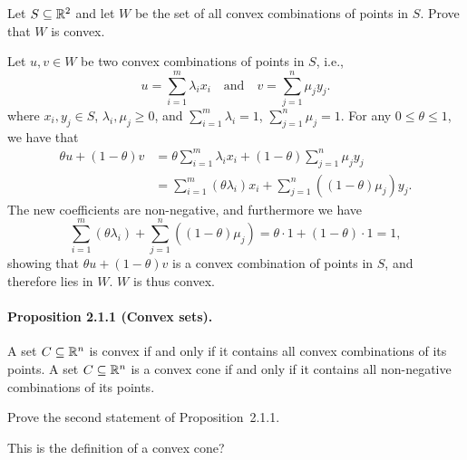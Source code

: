 \begin{exercise}
  Let $S \subseteq \mathbb{R}^2$ and let $W$ be the set of all convex combinations of points in $S$.
  Prove that $W$ is convex.
\end{exercise}

\begin{solution}
  Let $u, v \in W$ be two convex combinations of points in $S$, i.e.,
  \begin{equation}
    u = \sum_{i=1}^m \lambda_i x_i
    \quad\text{and}\quad
    v = \sum_{j=1}^n \mu_j y_j.
  \end{equation}
  where $x_i, y_j \in S$, $\lambda_i, \mu_j \geq 0$, and $\sum_{i=1}^m \lambda_i = 1$, $\sum_{j=1}^n \mu_j = 1$.
  For any $0 \leq \theta \leq 1$, we have that
  \begin{equation}
    \begin{split}
      \theta u + (1 - \theta) v
      &= \theta \sum_{i=1}^m \lambda_i x_i + (1 - \theta) \sum_{j=1}^n \mu_j y_j \\
      &= \sum_{i=1}^m (\theta \lambda_i) x_i + \sum_{j=1}^n ((1 - \theta) \mu_j) y_j.
    \end{split}
  \end{equation}
  The new coefficients are non-negative, and furthermore we have
  \begin{equation}
    \sum_{i=1}^m (\theta \lambda_i) + \sum_{j=1}^n ((1 - \theta) \mu_j)
    = \theta \cdot 1 + (1 - \theta) \cdot 1
    = 1,
  \end{equation}
  showing that $\theta u + (1 - \theta) v$ is a convex combination of points in $S$, and therefore lies in $W$.
  $W$ is thus convex.
\end{solution}

\paragraph{Proposition 2.1.1 (Convex sets).}
A set $C \subseteq \mathbb{R}^n$ is convex if and only if it contains all convex combinations of its points.
A set $C \subseteq \mathbb{R}^n$ is a convex cone if and only if it contains all non-negative combinations of its points.

\begin{exercise}
  Prove the second statement of Proposition~2.1.1.
\end{exercise}

\begin{solution}
  This is the definition of a convex cone?
\end{solution}

